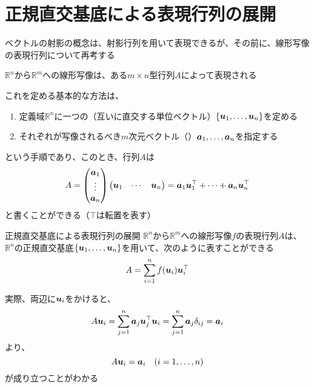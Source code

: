 \documentclass[../../../topic_linear-algebra]{subfiles}
\begin{document}
\sectionline
\section{正規直交基底による表現行列の展開}

ベクトルの射影の概念は、射影行列を用いて表現できるが、その前に、線形写像の表現行列について再考する

\br

$\mathbb{R}^n$から$\mathbb{R}^m$への線形写像は、ある$m \times n$型行列$A$によって表現される

\br

これを定める基本的な方法は、
\begin{enumerate}
  \item 定義域$\mathbb{R}^n$に一つの（互いに直交する単位ベクトル）$\{\vb*{u}_1,\ldots,\vb*{u}_n\}$を定める
  \item それぞれが写像されるべき$m$次元ベクトル（）$\vb*{a}_1,\ldots,\vb*{a}_n$を指定する
\end{enumerate}
という手順であり、このとき、行列$A$は
\begin{equation*}
  A = \begin{pmatrix}
    \vb*{a}_1 \\
    \vdots    \\
    \vb*{a}_n
  \end{pmatrix} \begin{pmatrix}
    \vb*{u}_1 & \cdots & \vb*{u}_n
  \end{pmatrix} = \vb*{a}_1 \vb*{u}_1^\top + \cdots + \vb*{a}_n \vb*{u}_n^\top
\end{equation*}
と書くことができる（$\top$は転置を表す）

\begin{theorem}{正規直交基底による表現行列の展開}\label{thm:orthobasis-formula-for-rep-matrix}
  $\mathbb{R}^n$から$\mathbb{R}^m$への線形写像$f$の表現行列$A$は、$\mathbb{R}^n$の正規直交基底$\{\vb*{u}_1,\ldots,\vb*{u}_n\}$を用いて、次のように表すことができる
  \begin{equation*}
    A = \sum_{i=1}^n f(\vb*{u}_i) \vb*{u}_i^\top
  \end{equation*}
\end{theorem}

実際、両辺に$\vb*{u}_i$をかけると、
\begin{equation*}
  A \vb*{u}_i = \sum_{j=1}^n \vb*{a}_j \vb*{u}_j^\top \vb*{u}_i
  = \sum_{j=1}^n \vb*{a}_j \delta_{ij}
  = \vb*{a}_i
\end{equation*}
より、
\begin{equation*}
  A \vb*{u}_i = \vb*{a}_i \quad (i = 1, \ldots, n)
\end{equation*}
が成り立つことがわかる
\end{document}
